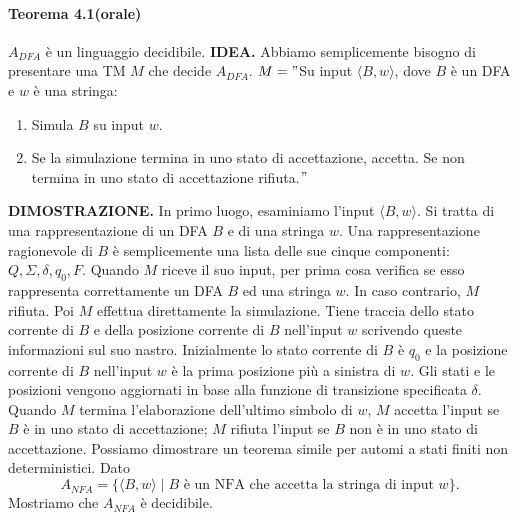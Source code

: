 \documentclass{article}
\begin{document}
\paragraph{Teorema 4.1(orale)}
\label{teorema-4.1}
$A_{DFA}$ è un linguaggio decidibile.
\vspace{1em}
\text{}
\newline
\hbox{\textbf{IDEA.}}
Abbiamo semplicemente bisogno di presentare una TM $M$ che decide $A_{DFA}$.
\vspace{1em}
\text{}
\newline
$M = "$Su input $\langle B,w \rangle$, dove $B$ è un DFA e $w$ è una stringa:
\begin{enumerate}
    \item Simula $B$ su input $w$.
    \item Se la simulazione termina in uno stato di accettazione, accetta. Se non termina in uno stato di accettazione rifiuta.$"$
\end{enumerate}
\vspace{1em}
\text{}
\newline
\hbox{\textbf{DIMOSTRAZIONE.}} 
In primo luogo, esaminiamo l'input $\langle B,w \rangle$.
Si tratta di una rappresentazione di un DFA $B$ e di una stringa $w$.
Una rappresentazione ragionevole di $B$ è semplicemente una lista delle sue cinque componenti: $Q,\Sigma,\delta,q_0,F$.
Quando $M$ riceve il suo input, per prima cosa verifica se esso rappresenta correttamente un DFA $B$ ed una stringa $w$.
In caso contrario, $M$ rifiuta.
Poi $M$ effettua direttamente la simulazione.
Tiene traccia dello stato corrente di $B$ e della posizione corrente di $B$ nell'input $w$ scrivendo queste informazioni sul suo nastro.
Inizialmente lo stato corrente di $B$ è $q_0$ e la posizione corrente di $B$ nell'input $w$ è la prima posizione più a sinistra di $w$.
Gli stati e le posizioni vengono aggiornati in base alla funzione di transizione specificata $\delta$.
Quando $M$ termina l'elaborazione dell'ultimo simbolo di $w$, $M$ accetta l'input se $B$ è in uno stato di accettazione; $M$ rifiuta l'input se $B$ non è in uno stato di accettazione.
\vspace{1em}
\text{}
\newline
Possiamo dimostrare un teorema simile per automi a stati finiti non deterministici. Dato 
$$
A_{NFA} = \{\langle B,w \rangle \mid B \text{ è un NFA che accetta la stringa di input } w \}.
$$
Mostriamo che $A_{NFA}$ è decidibile.
\newpage
\end{document}
